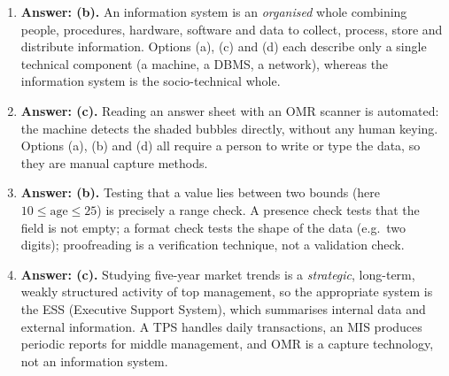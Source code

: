 \documentclass[11pt]{article}
\newcommand{\cle}[1]{{\popxbold\color{popdark}#1}}
\begin{document}
\begin{corrige}
\begin{enumerate}
\item \textbf{Answer: (b).} An information system is an \emph{organised} whole combining \cle{people}, \cle{procedures}, \cle{hardware}, \cle{software} and \cle{data} to collect, process, store and distribute information. Options (a), (c) and (d) each describe only a single technical component (a machine, a DBMS, a network), whereas the information system is the socio-technical whole.
\item \textbf{Answer: (c).} Reading an answer sheet with an \cle{OMR} scanner is automated: the machine detects the shaded bubbles directly, without any human keying. Options (a), (b) and (d) all require a person to write or type the data, so they are manual capture methods.
\item \textbf{Answer: (b).} Testing that a value lies between two bounds (here $10 \le \text{age} \le 25$) is precisely a \cle{range check}. A presence check tests that the field is not empty; a format check tests the shape of the data (e.g.\ two digits); proofreading is a verification technique, not a validation check.
\item \textbf{Answer: (c).} Studying five-year market trends is a \emph{strategic}, long-term, weakly structured activity of top management, so the appropriate system is the \cle{ESS} (Executive Support System), which summarises internal data and external information. A TPS handles daily transactions, an MIS produces periodic reports for middle management, and OMR is a capture technology, not an information system.
\end{enumerate}
\end{corrige}
\end{document}
